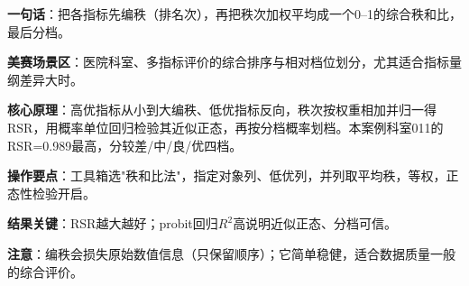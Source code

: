 
\begin{algobrief}
\textbf{一句话}：把各指标先编秩（排名次），再把秩次加权平均成一个0--1的综合秩和比，最后分档。

\textbf{美赛场景区}：医院科室、多指标评价的综合排序与相对档位划分，尤其适合指标量纲差异大时。

\textbf{核心原理}：高优指标从小到大编秩、低优指标反向，秩次按权重相加并归一得RSR，用概率单位回归检验其近似正态，再按分档概率划档。本案例科室011的RSR=0.989最高，分较差/中/良/优四档。

\textbf{操作要点}：工具箱选"秩和比法"，指定对象列、低优列，并列取平均秩，等权，正态性检验开启。

\textbf{结果关键}：RSR越大越好；probit回归$R^2$高说明近似正态、分档可信。

\textbf{注意}：编秩会损失原始数值信息（只保留顺序）；它简单稳健，适合数据质量一般的综合评价。
\end{algobrief}

